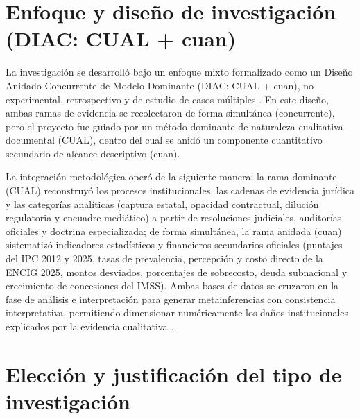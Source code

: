 

\section{Enfoque y diseño de investigación (DIAC: CUAL + cuan)}

La investigación se desarrolló bajo un enfoque mixto formalizado como un Diseño Anidado Concurrente de Modelo Dominante (DIAC: CUAL + cuan), no experimental, retrospectivo y de estudio de casos múltiples \citep{hernandez2014}. En este diseño, ambas ramas de evidencia se recolectaron de forma simultánea (concurrente), pero el proyecto fue guiado por un método dominante de naturaleza cualitativa-documental (CUAL), dentro del cual se anidó un componente cuantitativo secundario de alcance descriptivo (cuan).

La integración metodológica operó de la siguiente manera: la rama dominante (CUAL) reconstruyó los procesos institucionales, las cadenas de evidencia jurídica y las categorías analíticas (captura estatal, opacidad contractual, dilución regulatoria y encuadre mediático) a partir de resoluciones judiciales, auditorías oficiales y doctrina especializada; de forma simultánea, la rama anidada (cuan) sistematizó indicadores estadísticos y financieros secundarios oficiales (puntajes del IPC 2012 y 2025, tasas de prevalencia, percepción y costo directo de la ENCIG 2025, montos desviados, porcentajes de sobrecosto, deuda subnacional y crecimiento de concesiones del IMSS). Ambas bases de datos se cruzaron en la fase de análisis e interpretación para generar metainferencias con consistencia interpretativa, permitiendo dimensionar numéricamente los daños institucionales explicados por la evidencia cualitativa \citep{hernandez2014}.

\section{Elección y justificación del tipo de investigación}

